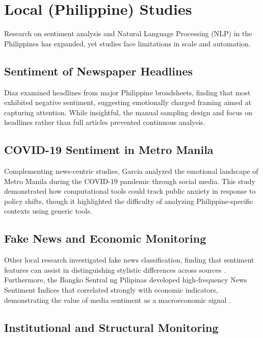 \section{Local (Philippine) Studies}\label{local-philippine-studies}

Research on sentiment analysis and Natural Language Processing (NLP) in the Philippines has expanded, yet studies face limitations in scale and automation.

\subsection{Sentiment of Newspaper Headlines}
\label{sentiment-of-newspaper-headlines}

Diaz \cite{ref03} examined headlines from major Philippine broadsheets, finding that most exhibited negative sentiment, suggesting emotionally charged framing aimed at capturing attention. While insightful, the manual sampling design and focus on headlines rather than full articles prevented continuous analysis.

\subsection{COVID-19 Sentiment in Metro Manila}
\label{covid-19-sentiment-in-metro-manila}

Complementing news-centric studies, Garcia \cite{ref05} analyzed the emotional landscape of Metro Manila during the COVID-19 pandemic through social media. This study demonstrated how computational tools could track public anxiety in response to policy shifts, though it highlighted the difficulty of analyzing Philippine-specific contexts using generic tools.

\subsection{Fake News and Economic Monitoring}
\label{fake-news-and-economic-monitoring}

Other local research investigated fake news classification, finding that sentiment features can assist in distinguishing stylistic differences across sources \cite{ref23}. Furthermore, the Bangko Sentral ng Pilipinas developed high-frequency News Sentiment Indices that correlated strongly with economic indicators, demonstrating the value of media sentiment as a macroeconomic signal \cite{ref22}.

\subsection{Institutional and Structural Monitoring}
\label{institutional-and-structural-monitoring}

